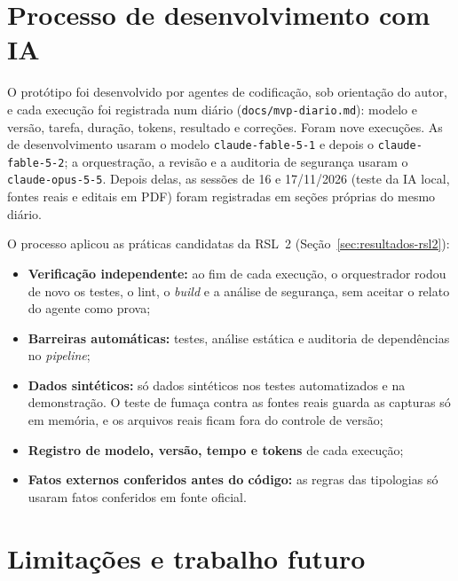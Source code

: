 \section{Processo de desenvolvimento com IA}
\label{sec:desenv-processo}

O protótipo foi desenvolvido por agentes de codificação, sob orientação do
autor, e cada execução foi registrada num diário (\texttt{docs/mvp-diario.md}):
modelo e versão, tarefa, duração, tokens, resultado e correções. Foram nove
execuções. As de desenvolvimento usaram o modelo \texttt{claude-fable-5-1} e
depois o \texttt{claude-fable-5-2}; a orquestração, a revisão e a auditoria
de segurança usaram o \texttt{claude-opus-5-5}. Depois delas, as sessões de
16 e 17/11/2026 (teste da IA local, fontes reais e editais em PDF) foram
registradas em seções próprias do mesmo diário.

O processo aplicou as práticas candidatas da RSL~2
(Seção~\ref{sec:resultados-rsl2}):
\begin{itemize}
	\item \textbf{Verificação independente:} ao fim de cada execução, o
	orquestrador rodou de novo os testes, o lint, o \textit{build} e a análise
	de segurança, sem aceitar o relato do agente como prova;
	\item \textbf{Barreiras automáticas:} testes, análise estática e auditoria
	de dependências no \textit{pipeline};
	\item \textbf{Dados sintéticos:} só dados sintéticos nos testes
	automatizados e na demonstração. O teste de fumaça contra as fontes reais
	guarda as capturas só em memória, e os arquivos reais ficam fora do
	controle de versão;
	\item \textbf{Registro de modelo, versão, tempo e tokens} de cada execução;
	\item \textbf{Fatos externos conferidos antes do código:} as regras das
	tipologias só usaram fatos conferidos em fonte oficial.
\end{itemize}

\section{Limitações e trabalho futuro}
\label{sec:desenv-limitacoes}

